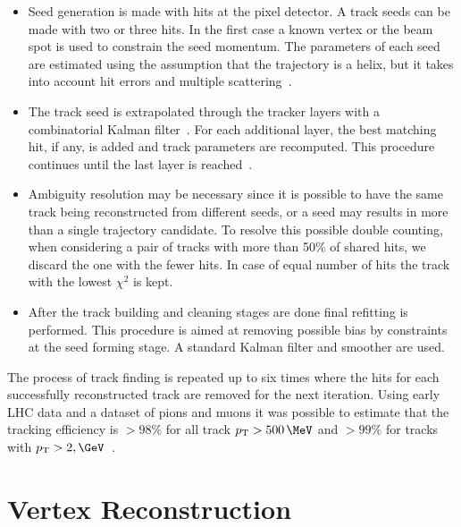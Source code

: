 \begin{itemize}
  \item Seed generation is made with hits at the pixel detector. A track seeds can be made with two or three hits. In the first case a known vertex or the beam spot is used to constrain the seed momentum. The parameters of each seed are estimated using the assumption that the trajectory is a helix, but it takes into account hit errors and multiple scattering~\cite{ARTICLE:CMSTrackReconstructionSeedGeneration}.
  \item The track seed is extrapolated through the tracker layers with a combinatorial Kalman filter~\cite{ARTICLE:KalmanFilteringTrackVertexFitting}. For each additional layer, the best matching hit, if any, is added and track parameters are recomputed. This procedure continues until the last layer is reached~\cite{ARTICLE:CMSTrackReconstruction}.
  \item Ambiguity resolution may be necessary since it is possible to have the same track being reconstructed from different seeds, or a seed may results in more than a single trajectory candidate. To resolve this possible double counting, when considering a pair of tracks with more than 50\% of shared hits, we discard the one with the fewer hits. In case of equal number of hits the track with the lowest $\chi^2$ is kept. 
  \item After the track building and cleaning stages are done final refitting is performed. This procedure is aimed at removing possible bias by constraints at the seed forming stage. A standard Kalman filter and smoother are used.
\end{itemize}

The process of track finding is repeated up to six times where the hits for each successfully reconstructed track are removed for the next iteration. Using early \gls{LHC} data and a dataset of pions and muons it was possible to estimate that the tracking efficiency is $>98\%$ for all track $\pt > 500\,\MeV$ and $>99\%$ for tracks with $\pt > 2,\GeV$~\cite{ARTICLE:CMSMeasurmentTrackEfficiency}.

\section{Vertex Reconstruction}
\label{SECTION:EventReconstructionAndSimulation_Vertex}

